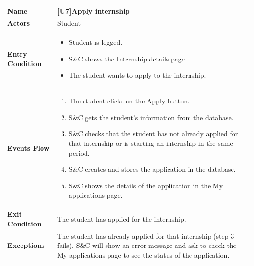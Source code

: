 \begin{center}
    \begin{tabular}{|p{9em}|p{27em}|}
        \hline
        \rowcolor{bluepoli!40}
        \textbf{Name} & \textbf{[U7]Apply internship} \\
        \hline
        \textbf{Actors} & Student \\
        \hline
        \textbf{Entry Condition} & 
        \begin{itemize}
            \item Student is logged.
            \item S\&C shows the Internship details page.
            \item The student wants to apply to the internship.
        \end{itemize} \\
        \hline
        \textbf{Events Flow} & 
        \begin{enumerate}
            \item The student clicks on the Apply button.
            \item S\&C gets the student's information from the database.
            \item S\&C checks that the student has not already applied for that internship or is starting an internship in the same period.
            \item S\&C creates and stores the application in the database.
            \item S\&C shows the details of the application in the My applications page.
        \end{enumerate} \\
        \hline
        \textbf{Exit Condition} & The student has applied for the internship. \\
        \hline
        \textbf{Exceptions} & The student has already applied for that internship (step 3 fails), S\&C will show an error message and ask to
        check the My applications page to see the status of the application. \\
        \hline
    \end{tabular}
\end{center}

